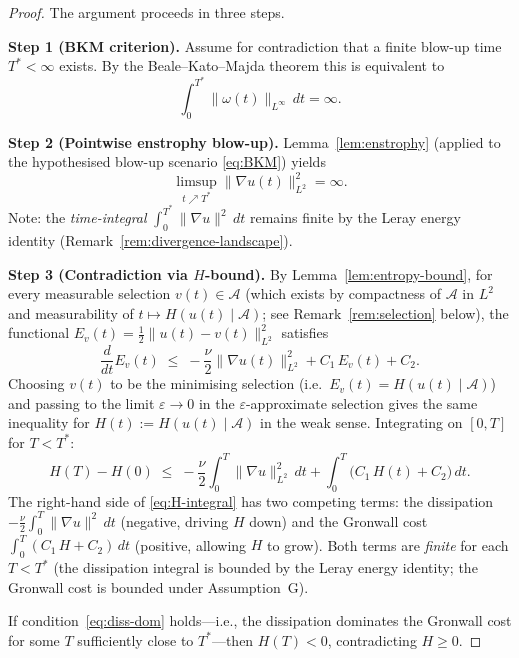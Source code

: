 \documentclass[12pt,a4paper]{article}
\theoremstyle{definition}
\theoremstyle{plain}
\theoremstyle{remark}
\begin{document}
\begin{proof}
The argument proceeds in three steps.

\medskip
\noindent\textbf{Step 1 (BKM criterion).}  Assume for contradiction that a finite
blow-up time $T^* < \infty$ exists.  By the Beale--Kato--Majda theorem
\cite{BealeKatoMajda1984} this is equivalent to
\begin{equation}\label{eq:BKM}
    \int_0^{T^*}\|\omega(t)\|_{L^\infty}\,dt = \infty.
\end{equation}

\medskip
\noindent\textbf{Step 2 (Pointwise enstrophy blow-up).}  Lemma~\ref{lem:enstrophy}
(applied to the hypothesised blow-up scenario \eqref{eq:BKM}) yields
\begin{equation}\label{eq:diss-inf}
    \limsup_{t \nearrow T^*}\|\nabla u(t)\|_{L^2}^2 = \infty.
\end{equation}
Note: the \emph{time-integral} $\int_0^{T^*}\|\nabla u\|^2\,dt$
remains finite by the Leray energy identity
(Remark~\ref{rem:divergence-landscape}).

\medskip
\noindent\textbf{Step 3 (Contradiction via $H$-bound).}
By Lemma~\ref{lem:entropy-bound}, for every measurable selection
$v(t)\in\mathcal{A}$ (which exists by compactness of $\mathcal{A}$ in $L^2$ and
measurability of $t\mapsto H(u(t)\mid\mathcal{A})$; see Remark~\ref{rem:selection}
below), the functional $E_v(t)=\tfrac12\|u(t)-v(t)\|_{L^2}^2$ satisfies
\[
    \frac{d}{dt}E_v(t)
    \;\le\; -\frac{\nu}{2}\|\nabla u(t)\|_{L^2}^2 + C_1\,E_v(t) + C_2.
\]
Choosing $v(t)$ to be the minimising selection (i.e.\ $E_v(t) = H(u(t)\mid\mathcal{A})$)
and passing to the limit $\varepsilon\to 0$ in the $\varepsilon$-approximate selection
gives the same inequality for $H(t):=H(u(t)\mid\mathcal{A})$ in the weak sense.
Integrating on $[0,T]$ for $T < T^*$:
\begin{equation}\label{eq:H-integral}
    H(T) - H(0)
    \;\le\;
    -\frac{\nu}{2}\int_0^T\|\nabla u\|_{L^2}^2\,dt
    + \int_0^T\!\big(C_1\,H(t) + C_2\big)\,dt.
\end{equation}
The right-hand side of \eqref{eq:H-integral} has two competing terms:
the dissipation $-\tfrac{\nu}{2}\int_0^T\|\nabla u\|^2\,dt$
(negative, driving $H$ down) and the Gronwall cost
$\int_0^T(C_1\,H + C_2)\,dt$ (positive, allowing $H$ to grow).
Both terms are \emph{finite} for each $T < T^*$ (the dissipation
integral is bounded by the Leray energy identity; the Gronwall cost
is bounded under Assumption~G).

If condition~\eqref{eq:diss-dom} holds---i.e., the dissipation
dominates the Gronwall cost for some $T$ sufficiently close to
$T^*$---then $H(T) < 0$, contradicting $H \ge 0$.


\end{proof}
\end{document}

